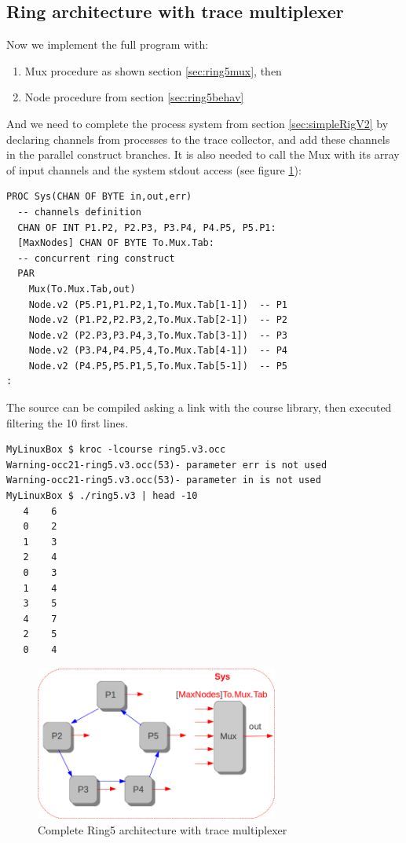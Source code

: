 \documentclass[times]{book}
\begin{document}
\subsection {Ring architecture with trace multiplexer }
\label{sec:ringArchiv3}

Now we implement the full program with:
\begin{enumerate}
\item Mux procedure as shown section \ref{sec:ring5mux}, then
\item Node procedure from section \ref{sec:ring5behav}
\end{enumerate}

And we need to complete the process system from section \ref{sec:simpleRigV2} by declaring channels from processes to the trace collector,
and add these channels in the parallel construct branches. It is also needed to call the Mux with
its array of input channels and the system stdout access (see figure 
\ref{fig:mux3}):


\begin{lstlisting}  
PROC Sys(CHAN OF BYTE in,out,err)
  -- channels definition
  CHAN OF INT P1.P2, P2.P3, P3.P4, P4.P5, P5.P1:
  [MaxNodes] CHAN OF BYTE To.Mux.Tab:
  -- concurrent ring construct
  PAR
    Mux(To.Mux.Tab,out)
    Node.v2 (P5.P1,P1.P2,1,To.Mux.Tab[1-1])  -- P1
    Node.v2 (P1.P2,P2.P3,2,To.Mux.Tab[2-1])  -- P2
    Node.v2 (P2.P3,P3.P4,3,To.Mux.Tab[3-1])  -- P3
    Node.v2 (P3.P4,P4.P5,4,To.Mux.Tab[4-1])  -- P4
    Node.v2 (P4.P5,P5.P1,5,To.Mux.Tab[5-1])  -- P5
:
\end{lstlisting} 

The source can be compiled asking a link with the course library, 
then executed filtering the 10 first lines.
 
\begin{lstlisting} 
MyLinuxBox $ kroc -lcourse ring5.v3.occ
Warning-occ21-ring5.v3.occ(53)- parameter err is not used
Warning-occ21-ring5.v3.occ(53)- parameter in is not used
MyLinuxBox $ ./ring5.v3 | head -10
   4    6
   0    2
   1    3
   2    4
   0    3
   1    4
   3    5
   4    7
   2    5
   0    4
\end{lstlisting} 


\begin{figure}[hbtp]
\begin{center} 
\includegraphics[width=8cm]{mux3.png}
\caption{Complete Ring5 architecture with trace multiplexer
}
\label{fig:mux3}
\end{center}
\end{figure}
\end{document}

